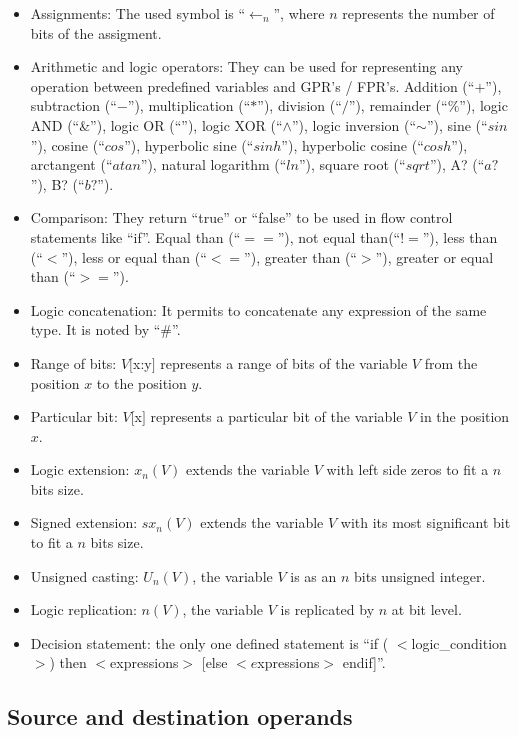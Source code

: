 \begin{itemize}
\item Assignments: The used symbol is ``$\longleftarrow_n$'', where $n$ represents the number of bits of the assigment.
\item Arithmetic and logic operators: They can be used for representing any operation between predefined variables and GPR's / FPR's. Addition (``$+$''),
      subtraction (``$-$''), multiplication (``$*$''), division (``$/$''), remainder (``$\%$''), logic AND (``\&''), logic OR (``\textbar''),
      logic XOR (``$\wedge$''), logic inversion (``$\sim$''), sine (``$sin$''), cosine (``$cos$''), hyperbolic sine (``$sinh$''),
      hyperbolic cosine (``$cosh$''), arctangent (``$atan$''), natural logarithm (``$ln$''), square root (``$sqrt$''), A? (``$a?$''), B? (``$b?$'').
\item Comparison: They return ``true'' or ``false'' to be used in flow control statements like
      ``if''. Equal than (``$==$''), not equal than(``$!=$''), less than (``$<$''), less or equal than (``$<=$''),
      greater than (``$>$''), greater or equal than (``$>=$'').
\item Logic concatenation: It permits to concatenate any expression of the same type. It is noted by ``\#''.
\item Range of bits: $V[$x:y$]$ represents a range of bits of the variable $V$ from the position $x$ to the
      position $y$.
\item Particular bit: $V[$x$]$ represents a particular bit of the variable $V$ in the position $x$.
\item Logic extension: $x_{n}(V)$ extends the variable $V$ with left side zeros to fit a $n$ bits size.
\item Signed extension: $sx_{n}(V)$ extends the variable $V$ with its most significant bit to fit a $n$ bits size.
\item Unsigned casting: $U_n(V)$, the variable $V$ is as an $n$ bits unsigned integer.
\item Logic replication: $n(V)$, the variable $V$ is replicated by $n$ at bit level.
\item Decision statement: the only one defined statement is ``if ( $<$logic\_condition$>$) then $<$expressions$>$ [else $<e$xpressions$>$ endif]''.
\end{itemize}

\subsection{Source and destination operands}
\label{ssec:isa_operands}

